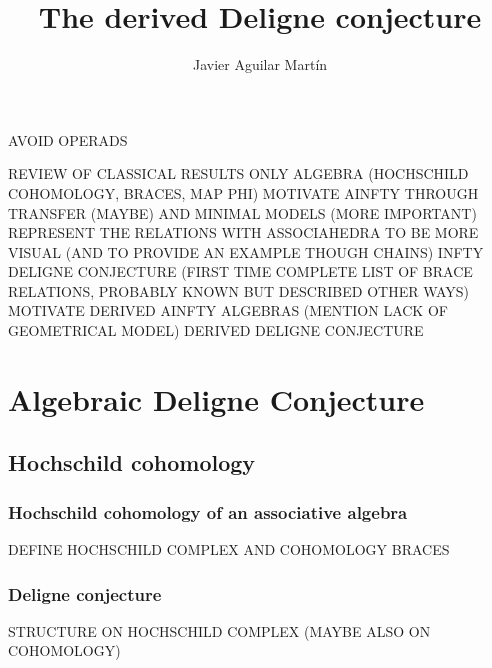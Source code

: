 \documentclass{beamer}
\title{The derived Deligne conjecture}
\author{Javier Aguilar Mart\'in}
\institute{University of Kent}
\date{}
\theoremstyle{definition}
\begin{document}
\frame{\titlepage}

\begin{frame}
AVOID OPERADS

REVIEW OF CLASSICAL RESULTS ONLY ALGEBRA (HOCHSCHILD COHOMOLOGY, BRACES, MAP PHI)
MOTIVATE AINFTY THROUGH TRANSFER (MAYBE) AND MINIMAL MODELS (MORE IMPORTANT)
REPRESENT THE RELATIONS WITH ASSOCIAHEDRA TO BE MORE VISUAL (AND TO PROVIDE AN EXAMPLE THOUGH CHAINS)
INFTY DELIGNE CONJECTURE (FIRST TIME COMPLETE LIST OF BRACE RELATIONS, PROBABLY KNOWN BUT DESCRIBED OTHER WAYS)
MOTIVATE DERIVED AINFTY ALGEBRAS (MENTION LACK OF GEOMETRICAL MODEL)
DERIVED DELIGNE CONJECTURE

\end{frame}
\begin{frame}
\tableofcontents
\end{frame}

\section{Algebraic Deligne Conjecture}
\subsection{Hochschild cohomology}
\begin{frame}
\frametitle{Hochschild cohomology of an associative algebra}
DEFINE HOCHSCHILD COMPLEX AND COHOMOLOGY
BRACES
\end{frame}
\begin{frame}
\frametitle{Deligne conjecture}
STRUCTURE ON HOCHSCHILD COMPLEX (MAYBE ALSO ON COHOMOLOGY)
\end{frame}
\end{document}
